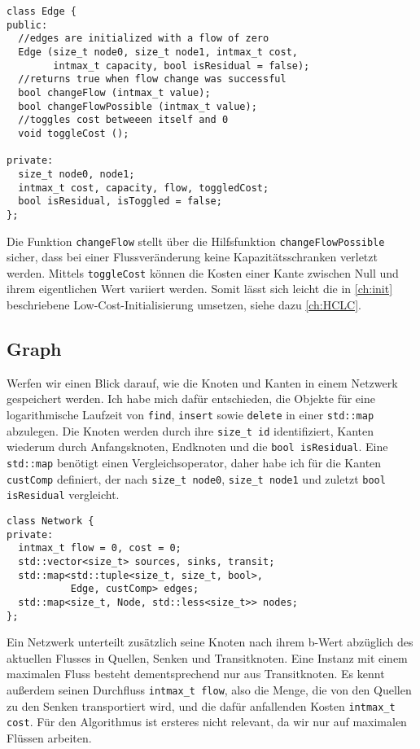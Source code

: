 \begin{lstlisting}
class Edge {
public:
  //edges are initialized with a flow of zero
  Edge (size_t node0, size_t node1, intmax_t cost,
        intmax_t capacity, bool isResidual = false);
  //returns true when flow change was successful
  bool changeFlow (intmax_t value);
  bool changeFlowPossible (intmax_t value);
  //toggles cost betweeen itself and 0
  void toggleCost ();

private:
  size_t node0, node1;
  intmax_t cost, capacity, flow, toggledCost;
  bool isResidual, isToggled = false;
};
\end{lstlisting}

Die Funktion \lstinline|changeFlow| stellt über die Hilfsfunktion \lstinline|changeFlowPossible| sicher, dass bei einer Flussveränderung keine Kapazitätsschranken verletzt werden. Mittels \lstinline|toggleCost| können die Kosten einer Kante zwischen Null und ihrem eigentlichen Wert variiert werden. Somit lässt sich leicht die in \cref{ch:init} beschriebene Low-Cost-Initialisierung umsetzen, siehe dazu \cref{ch:HCLC}.

\subsection{Graph}\label{ch:graph}
Werfen wir einen Blick darauf, wie die Knoten und Kanten in einem Netzwerk gespeichert werden. Ich habe mich dafür entschieden, die Objekte für eine logarithmische Laufzeit von \lstinline|find|, \lstinline|insert| sowie \lstinline|delete| in einer \lstinline|std::map| abzulegen. Die Knoten werden durch ihre \lstinline|size_t id| identifiziert, Kanten wiederum durch Anfangsknoten, Endknoten und die \lstinline|bool isResidual|. Eine \lstinline|std::map| benötigt einen Vergleichsoperator, daher habe ich für die Kanten \lstinline|custComp| definiert, der nach \lstinline|size_t node0|, \lstinline|size_t node1| und zuletzt \lstinline|bool isResidual| vergleicht.

\begin{lstlisting}
class Network {
private:
  intmax_t flow = 0, cost = 0;
  std::vector<size_t> sources, sinks, transit;
  std::map<std::tuple<size_t, size_t, bool>,
           Edge, custComp> edges;
  std::map<size_t, Node, std::less<size_t>> nodes;
};
\end{lstlisting}

Ein Netzwerk unterteilt zusätzlich seine Knoten nach ihrem b-Wert abzüglich des aktuellen Flusses in Quellen, Senken und Transitknoten. Eine Instanz mit einem maximalen Fluss besteht dementsprechend nur aus Transitknoten. Es kennt außerdem seinen Durchfluss \lstinline|intmax_t flow|, also die Menge, die von den Quellen zu den Senken transportiert wird, und die dafür anfallenden Kosten \lstinline|intmax_t cost|. Für den Algorithmus ist ersteres nicht relevant, da wir nur auf maximalen Flüssen arbeiten.

